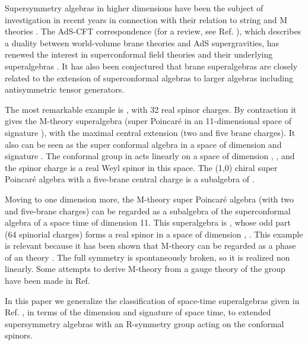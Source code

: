 \documentclass[a4paper,12pt]{article}
\begin{document}
Supersymmetry algebras in higher dimensions \cite{na,st} have been
the subject of investigation in recent years in connection with
their relation to string and M theories \cite{hw}. The AdS-CFT
correspondence (for a review, see Ref. \cite{agmoo}), which
describes a duality between world-volume brane theories and AdS
supergravities, has renewed the interest in superconformal field
theories and their underlying superalgebras \cite{to, gu, fp, vp}.
It has also been conjectured \cite{hw, to, gu, fp, ba, ho} that
brane superalgebras are closely related to the extension of
superconformal algebras to larger algebras including antisymmetric
tensor generators.

 The most remarkable example is \coordHE{},
  with  32 real spinor charges. By contraction \cite{df} it gives the
M-theory superalgebra (super Poincar\'e in an 11-dimensional space
of signature \coordHE{}), with the maximal central extension (two
and five brane charges). It also can be seen as the super
conformal algebra in a space of dimension  \coordHE{} and signature
\coordHE{} \cite{to,gu}. The conformal group in \coordHE{} acts linearly
on a space of dimension \coordHE{}, \coordHE{}, and the spinor charge is a
real Weyl spinor in this space. The (1,0) chiral \coordHE{} super
Poincar\'e algebra with a five-brane central charge is a
subalgebra of \coordHE{}.

Moving to one dimension more, the M-theory super Poincar\'e
algebra (with two and five-brane charges) can be regarded as a
subalgebra of the superconformal algebra  of a space time of
dimension 11. This superalgebra is \coordHE{}, whose odd
part (64 spinorial charges) forms a real spinor in a space of
dimension \coordHE{}, \coordHE{} \cite{vv, dflv}. This example is relevant
because it has been shown that M-theory can be regarded as a phase
 of an \coordHE{}
theory \cite{we}. The full symmetry is spontaneously broken, so it
is realized non linearly. Some attempts to derive M-theory from a
gauge theory of the group \coordHE{} have been made in Ref.
\cite{ho}

In this paper we generalize the classification of space-time
superalgebras given in  Ref. \cite{dflv}, in terms of the
dimension \coordHE{} and signature \myHighlight{$\rho$}\coordHE{} of space time, to extended
supersymmetry algebras with an R-symmetry group acting on the
conformal spinors.
\end{document}
